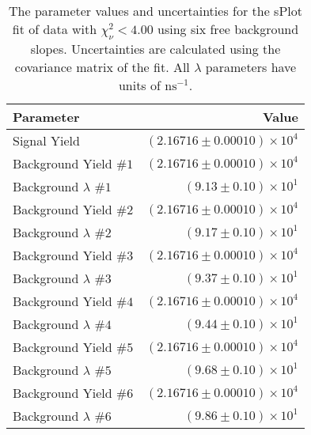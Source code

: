 
\begin{table}[h]
    \begin{center}
        \begin{tabular}{lr}\toprule
            Parameter & Value \\\midrule
            Signal Yield & $(2.16716 \pm 0.00010) \times 10^{4}$ \\
            Background Yield $\#1$ & $(2.16716 \pm 0.00010) \times 10^{4}$ \\
            Background $\lambda$ $\#1$ & $(9.13 \pm 0.10) \times 10^{1}$ \\
            Background Yield $\#2$ & $(2.16716 \pm 0.00010) \times 10^{4}$ \\
            Background $\lambda$ $\#2$ & $(9.17 \pm 0.10) \times 10^{1}$ \\
            Background Yield $\#3$ & $(2.16716 \pm 0.00010) \times 10^{4}$ \\
            Background $\lambda$ $\#3$ & $(9.37 \pm 0.10) \times 10^{1}$ \\
            Background Yield $\#4$ & $(2.16716 \pm 0.00010) \times 10^{4}$ \\
            Background $\lambda$ $\#4$ & $(9.44 \pm 0.10) \times 10^{1}$ \\
            Background Yield $\#5$ & $(2.16716 \pm 0.00010) \times 10^{4}$ \\
            Background $\lambda$ $\#5$ & $(9.68 \pm 0.10) \times 10^{1}$ \\
            Background Yield $\#6$ & $(2.16716 \pm 0.00010) \times 10^{4}$ \\
            Background $\lambda$ $\#6$ & $(9.86 \pm 0.10) \times 10^{1}$ \\\bottomrule
        \end{tabular}
        \caption{The parameter values and uncertainties for the sPlot fit of data with $\chi^2_\nu < 4.00$ using six free background slopes. Uncertainties are calculated using the covariance matrix of the fit. All $\lambda$ parameters have units of $\si{\nano\second}^{-1}$.}
    \end{center}
\end{table}
